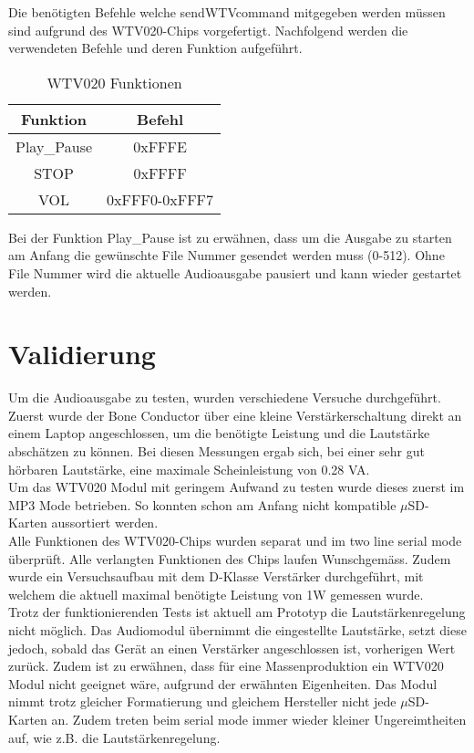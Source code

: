 Die benötigten Befehle welche sendWTVcommand mitgegeben werden müssen sind aufgrund des WTV020-Chips vorgefertigt.
Nachfolgend werden die verwendeten Befehle und deren Funktion aufgeführt.\\

	
\begin{table}[h]
	\centering
	\begin{tabular}{|c|c|} 
		Funktion & Befehl\\ 
		\hline 
		Play\_Pause & 0xFFFE \\ 
		\hline 
		STOP & 0xFFFF \\ 
		\hline 
		VOL & 0xFFF0-0xFFF7 \\ 
	\end{tabular} 
	\caption{WTV020 Funktionen}
	\label{WTVFunktionen}
\end{table} 

Bei der Funktion Play\_Pause ist zu erwähnen, dass um die Ausgabe zu starten am Anfang die gewünschte File Nummer gesendet werden muss (0-512). Ohne File Nummer wird die aktuelle Audioausgabe pausiert und kann wieder gestartet werden.

\section{Validierung}
Um die Audioausgabe zu testen, wurden verschiedene Versuche durchgeführt. Zuerst wurde der Bone Conductor über eine kleine Verstärkerschaltung direkt an einem Laptop angeschlossen, um die benötigte Leistung und die Lautstärke abschätzen zu können. Bei diesen Messungen ergab sich, bei einer sehr gut hörbaren Lautstärke, eine maximale Scheinleistung von 0.28 VA.\\
Um das WTV020 Modul mit geringem Aufwand zu testen wurde dieses zuerst im MP3 Mode betrieben.
So konnten schon am Anfang nicht kompatible $\mu$SD-Karten aussortiert werden. \\
Alle Funktionen des WTV020-Chips wurden separat und im two line serial mode überprüft. Alle verlangten Funktionen des Chips laufen Wunschgemäss. Zudem wurde ein Versuchsaufbau mit dem D-Klasse Verstärker durchgeführt, mit welchem die aktuell maximal benötigte Leistung von 1W gemessen wurde. \\
Trotz der funktionierenden Tests ist aktuell am Prototyp die Lautstärkenregelung nicht möglich. Das Audiomodul übernimmt die eingestellte Lautstärke, setzt diese jedoch, sobald das Gerät an einen Verstärker angeschlossen ist, vorherigen Wert zurück. Zudem ist zu erwähnen, dass für eine Massenproduktion ein WTV020 Modul nicht geeignet wäre, aufgrund der erwähnten Eigenheiten. Das Modul nimmt trotz gleicher Formatierung und gleichem Hersteller nicht jede $\mu$SD-Karten an. Zudem treten beim serial mode immer wieder kleiner Ungereimtheiten auf, wie z.B. die Lautstärkenregelung. 
